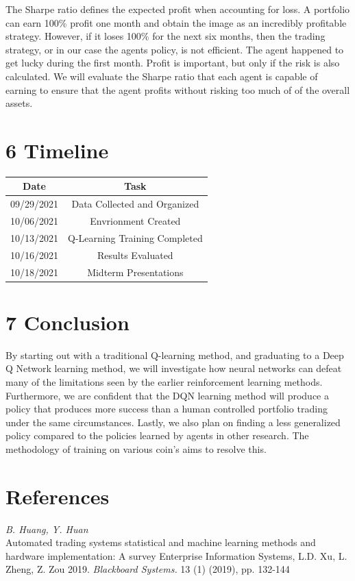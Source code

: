 \documentclass[letterpaper]{article}
\begin{document}
The Sharpe ratio defines the expected profit when accounting for loss. A portfolio can earn 100\% profit one month and obtain the image as an incredibly profitable strategy. However, if it loses 100\% for the next six months, then the trading strategy, or in our case the agents policy, is not efficient. The agent happened to get lucky during the first month. Profit is important, but only if the risk is also calculated. We will evaluate the Sharpe ratio that each agent is capable of earning to ensure that the agent profits without risking too much of of the overall assets.
	
\section{6 Timeline}
\begin{center}
\begin{tabular}{||c|c|||} 
 \hline
 Date & Task \\ [0.5ex] 
 \hline\hline
 09/29/2021 & Data Collected and Organized \\ 
 \hline
 10/06/2021 & Envrionment Created \\
 \hline
 10/13/2021 & Q-Learning Training Completed \\
 \hline
 10/16/2021 & Results Evaluated \\
 \hline
 10/18/2021 & Midterm Presentations \\ [1ex] 
 \hline
\end{tabular}
\end{center}

\section{7 Conclusion}
By starting out with a traditional Q-learning method, and graduating to a Deep Q Network learning method, we will investigate how neural networks can defeat many of the limitations seen by the earlier reinforcement learning methods. Furthermore, we are confident that the DQN learning method will produce a policy that produces more success than a human controlled portfolio trading under the same circumstances. Lastly, we also plan on finding a less generalized policy compared to the policies learned by agents in other research. The methodology of training on various coin's aims to resolve this. 

\section{References}
\smallskip \noindent \textit{B. Huang, Y. Huan}\\
Automated trading systems statistical and machine learning methods and hardware implementation: A survey Enterprise Information Systems, L.D. Xu, L. Zheng, Z. Zou 2019. \textit{Blackboard Systems.} 13 (1) (2019), pp. 132-144
\end{document}
